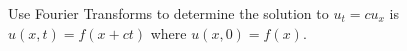 \item Use Fourier Transforms to determine the solution to $u_t = cu_x$ is $u(x, t) = f(x + ct)$ where $u(x, 0) = f(x)$.
\bigbreak
